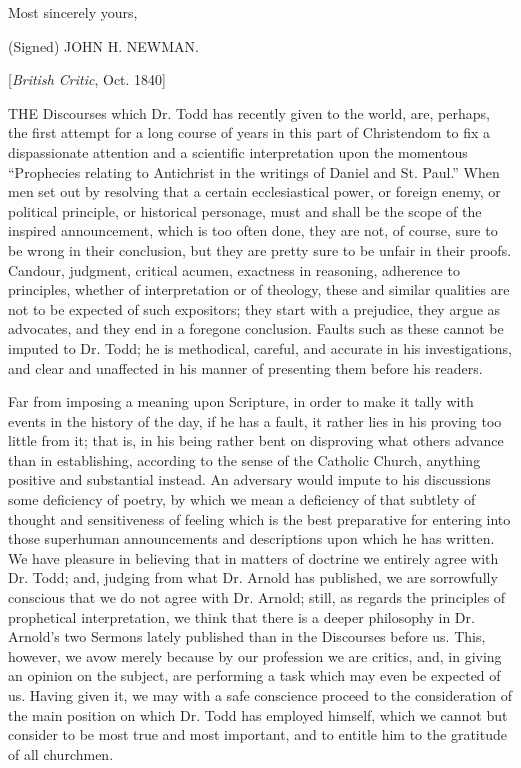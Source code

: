 Most sincerely yours,

(Signed) JOHN H. NEWMAN.


[\emph{British Critic}, Oct. 1840]

THE Discourses which Dr. Todd has
recently given to the world, are, perhaps, the first attempt for a
long course of years in this part of Christendom to fix a
dispassionate attention and a scientific interpretation upon the
momentous ``Prophecies relating to Antichrist in the writings of
Daniel and St. Paul.'' When men set out by resolving that a
certain ecclesiastical power, or foreign enemy, or political
principle, or historical personage, must and shall be the scope of the
inspired announcement, which is too often done, they are not, of
course, sure to be wrong in their conclusion, but they are pretty sure
to be unfair in their proofs. Candour, judgment, critical acumen,
exactness in reasoning, adherence to principles, whether of
interpretation or of theology, these and similar qualities are not to
be expected of such expositors; they start with a prejudice, they
argue as advocates, and they end in a foregone conclusion. Faults such
as these cannot be imputed to Dr. Todd; he is methodical, careful, and
accurate in his investigations, and clear and unaffected in his manner
of presenting them before his readers.

Far from imposing a meaning upon Scripture, in order to make it
tally with events in the history of the day, if he has a fault,
it rather lies in his proving too little from it; that is, in his
being rather bent on disproving what others advance than in
establishing, according to the sense of the Catholic Church, anything
positive and substantial instead. An adversary would impute to his
discussions some deficiency of poetry, by which we mean a deficiency
of that subtlety of thought and sensitiveness of feeling which is the
best preparative for entering into those superhuman announcements and
descriptions upon which he has written. We have pleasure in believing
that in matters of doctrine we entirely agree with Dr. Todd; and,
judging from what Dr. Arnold has published, we are sorrowfully
conscious that we do not agree with Dr. Arnold; still, as regards the
principles of prophetical interpretation, we think that there is a
deeper philosophy in Dr. Arnold's two Sermons lately published than in
the Discourses before us. This, however, we avow merely because by our
profession we are critics, and, in giving an opinion on the subject,
are performing a task which may even be expected of us. Having given
it, we may with a safe conscience proceed to the consideration of the
main position on which Dr. Todd has employed himself, which we cannot
but consider to be most true and most important, and to entitle him to
the gratitude of all churchmen.

